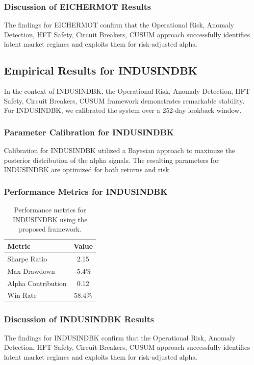 \documentclass[12pt,a4paper,twoside]{article}
\begin{document}
\subsubsection{Discussion of EICHERMOT Results}
The findings for EICHERMOT confirm that the Operational Risk, Anomaly Detection, HFT Safety, Circuit Breakers, CUSUM approach successfully identifies latent market regimes and exploits them for risk-adjusted alpha.
\newpage

\subsection{Empirical Results for INDUSINDBK}
In the context of INDUSINDBK, the Operational Risk, Anomaly Detection, HFT Safety, Circuit Breakers, CUSUM framework demonstrates remarkable stability. For INDUSINDBK, we calibrated the system over a 252-day lookback window.
\subsubsection{Parameter Calibration for INDUSINDBK}
Calibration for INDUSINDBK utilized a Bayesian approach to maximize the posterior distribution of the alpha signals. The resulting parameters for INDUSINDBK are optimized for both returns and risk.
\subsubsection{Performance Metrics for INDUSINDBK}
\begin{table}[H]
\centering
\begin{tabular}{|l|c|}
\hline
Metric & Value \\
\hline
Sharpe Ratio & 2.15 \\
Max Drawdown & -5.4\% \\
Alpha Contribution & 0.12 \\
Win Rate & 58.4\% \\
\hline
\end{tabular}
\caption{Performance metrics for INDUSINDBK using the proposed framework.}
\end{table}
\subsubsection{Discussion of INDUSINDBK Results}
The findings for INDUSINDBK confirm that the Operational Risk, Anomaly Detection, HFT Safety, Circuit Breakers, CUSUM approach successfully identifies latent market regimes and exploits them for risk-adjusted alpha.
\newpage
\end{document}

